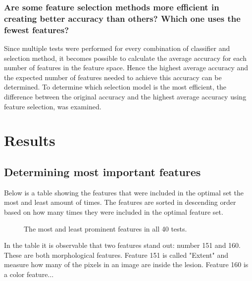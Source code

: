 \documentclass{kththesis}
\begin{document}
\subsection{Are some feature selection methods more efficient in creating better accuracy than others? Which one uses the fewest features?}
Since multiple tests were performed for every combination of classifier and selection method, it becomes possible to calculate the average accuracy for each number of features in the feature space. Hence the highest average accuracy and the expected number of features needed to achieve this accuracy can be determined. To determine which selection model is the most efficient, the difference between the original accuracy and the highest average accuracy using feature selection, was examined.







\chapter{Results}

\section{Determining most important features}

Below is a table showing the features that were included in the optimal set the most and least amount of times. The features are sorted in descending order based on how many times they were included in the optimal feature set.



\begin{figure}[h!]
  \begin{center}
    \caption{The most and least prominent features in all 40 tests.}
  \end{center}
\end{figure}
\newpage
In the table it is observable that two features stand out: number 151 and 160. These are both morphological features.%
Feature 151 is called "Extent" and measure how many of the pixels in an image are inside the lesion. %
Feature 160 is a color feature... %
\end{document}
